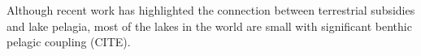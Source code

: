 Although recent work has highlighted the connection between terrestrial subsidies and lake pelagia, most of the lakes in the world are small \cite{Downing_2007} with significant benthic pelagic coupling (CITE). \cite{MCCONNELL_1968}







